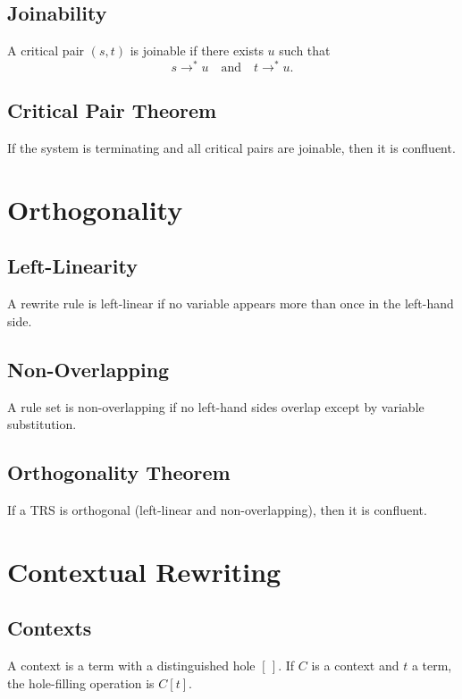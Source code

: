 \subsection{Joinability}

A critical pair $(s,t)$ is joinable if there exists $u$ such that
\[
s \to^\ast u
\quad\text{and}\quad
t \to^\ast u.
\]

\subsection{Critical Pair Theorem}

If the system is terminating and all critical pairs are joinable, then it is confluent.

\section{Orthogonality}

\subsection{Left-Linearity}

A rewrite rule is left-linear if no variable appears more than once in the left-hand side.

\subsection{Non-Overlapping}

A rule set is non-overlapping if no left-hand sides overlap except by variable substitution.

\subsection{Orthogonality Theorem}

If a TRS is orthogonal (left-linear and non-overlapping), then it is confluent.

\section{Contextual Rewriting}

\subsection{Contexts}

A context is a term with a distinguished hole $[\,]$.  
If $C$ is a context and $t$ a term, the hole-filling operation is $C[t]$.

